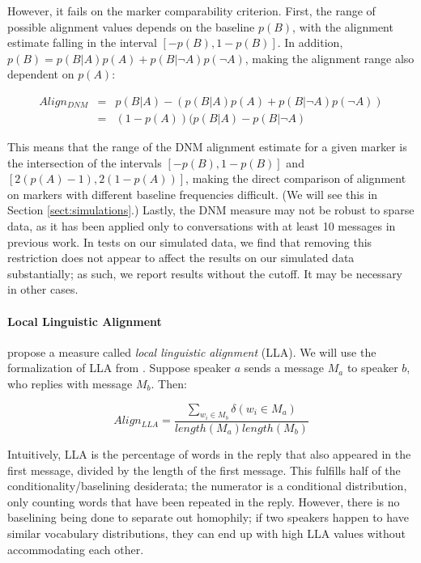 \documentclass{acm_proc_article-sp}
\begin{document}
However, it fails on the marker comparability criterion.  First, the range of possible alignment values depends on the baseline $p(B)$, with the alignment estimate falling in the interval $[-p(B),1-p(B)]$.  In addition, $p(B) = p(B|A)p(A) + p(B|\neg A)p(\neg A)$, making the alignment range also dependent on $p(A)$:

\begin{align*}
Align_{DNM} & = & p(B|A) - (p(B|A)p(A) + p(B|\neg A)p(\neg A)) \\
& = & (1-p(A))(p(B|A) - p(B|\neg A)
\end{align*} 

This means that the range of the DNM alignment estimate for a given marker is the intersection of the intervals $[-p(B), 1-p(B)]$ and $[2(p(A)-1), 2(1-p(A))]$, making the direct comparison of alignment on markers with different baseline frequencies difficult. (We will see this in Section \ref{sect:simulations}.)  Lastly, the DNM measure may not be robust to sparse data, as it has been applied only to conversations with at least 10 messages in previous work.  In tests on our simulated data, we find that removing this restriction does not appear to affect the results on our simulated data substantially; as such, we report results without the cutoff. It may be necessary in other cases.

\paragraph{Local Linguistic Alignment} \cite{FusaroliEtAl2012} propose a measure called \textit{local linguistic alignment} (LLA).    We will use the formalization of LLA from \cite{WangReitterYen2014}.  Suppose speaker $a$ sends a message $M_a$ to speaker $b$, who replies with message $M_b$. Then:

\begin{equation}
Align_{LLA} = \frac{\sum_{w_i \in M_b} \delta(w_i \in M_a)}{length(M_a)length(M_b)}
\end{equation}

Intuitively, LLA is the percentage of words in the reply that also appeared in the first message, divided by the length of the first message.  This fulfills half of the conditionality/baselining desiderata; the numerator is a conditional distribution, only counting words that have been repeated in the reply.  However, there is no baselining being done to separate out homophily; if two speakers happen to have similar vocabulary distributions, they can end up with high LLA values without accommodating each other.
\end{document}
